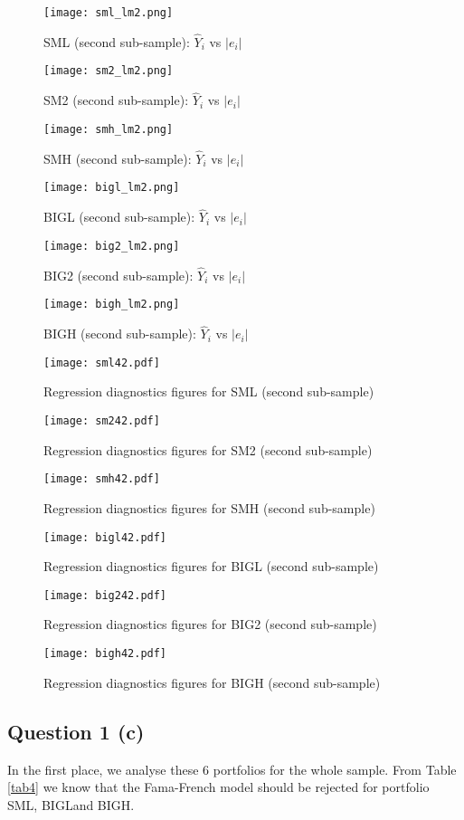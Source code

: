 \documentclass[11pt]{article}
\begin{document}
\begin{figure}
\centering
\texttt{[image: sml\_lm2.png]}
\caption{SML (second sub-sample): $\hat{Y}_i$ vs $|e_i|$}
\label{smllm2}
\texttt{[image: sm2\_lm2.png]}
\caption{SM2 (second sub-sample): $\hat{Y}_i$ vs $|e_i|$}
\label{sm2lm2}
\end{figure}
\begin{figure}
\centering
\texttt{[image: smh\_lm2.png]}
\caption{SMH (second sub-sample): $\hat{Y}_i$ vs $|e_i|$}
\label{smhlm2}
\texttt{[image: bigl\_lm2.png]}
\caption{BIGL (second sub-sample): $\hat{Y}_i$ vs $|e_i|$}
\label{bigllm2}
\end{figure}
\begin{figure}
\centering
\texttt{[image: big2\_lm2.png]}
\caption{BIG2 (second sub-sample): $\hat{Y}_i$ vs $|e_i|$}
\label{big2lm2}
\texttt{[image: bigh\_lm2.png]}
\caption{BIGH (second sub-sample): $\hat{Y}_i$ vs $|e_i|$}
\label{bighlm2}
\end{figure}


\begin{figure}
\texttt{[image: sml42.pdf]}
\caption{Regression diagnostics figures for SML (second sub-sample)}
\label{sml42}
\end{figure}
\begin{figure}
\texttt{[image: sm242.pdf]}
\caption{Regression diagnostics figures for SM2 (second sub-sample)}
\label{sm242}
\end{figure}
\begin{figure}
\texttt{[image: smh42.pdf]}
\caption{Regression diagnostics figures for SMH (second sub-sample)}
\label{smh42}
\end{figure}
\begin{figure}
\texttt{[image: bigl42.pdf]}
\caption{Regression diagnostics figures for BIGL (second sub-sample)}
\label{bigl42}
\end{figure}
\FloatBarrier
\begin{figure}
\texttt{[image: big242.pdf]}
\caption{Regression diagnostics figures for BIG2 (second sub-sample)}
\label{big242}
\end{figure}
\begin{figure}
\centering
\texttt{[image: bigh42.pdf]}
\caption{Regression diagnostics figures for BIGH (second sub-sample)}
\label{bigh42}
\end{figure}

\subsection{Question 1 (c)}
In the first place, we analyse these 6 portfolios for the whole sample.
From Table \ref{tab4} we know that the Fama-French model should be rejected for portfolio SML, BIGLand BIGH.
\end{document}
